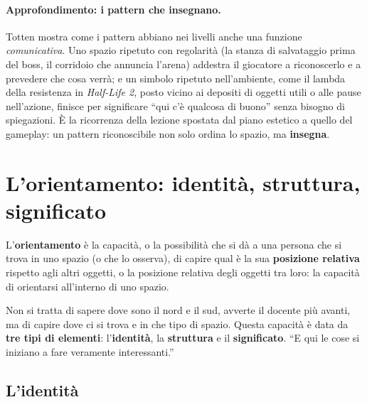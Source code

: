 \paragraph{Approfondimento: i pattern che insegnano.} Totten mostra come i pattern abbiano
nei livelli anche una funzione \emph{comunicativa}. Uno spazio ripetuto con regolarità (la
stanza di salvataggio prima del boss, il corridoio che annuncia l'arena) addestra il
giocatore a riconoscerlo e a prevedere che cosa verrà; e un simbolo ripetuto
nell'ambiente, come il lambda della resistenza in \emph{Half-Life 2}, posto vicino ai
depositi di oggetti utili o alle pause nell'azione, finisce per significare ``qui c'è
qualcosa di buono'' senza bisogno di spiegazioni. È la ricorrenza della lezione spostata
dal piano estetico a quello del gameplay: un pattern riconoscibile non solo ordina lo
spazio, ma \textbf{insegna}.

\section{L'orientamento: identità, struttura, significato}
\label{gd17:sec:orientamento}



\begin{definition}[Orientamento]
L'\textbf{orientamento} è la capacità, o la possibilità che si dà a una persona che si
trova in uno spazio (o che lo osserva), di capire qual è la sua \textbf{posizione
relativa} rispetto agli altri oggetti, o la posizione relativa degli oggetti tra loro: la
capacità di orientarsi all'interno di uno spazio.
\end{definition}

Non si tratta di sapere dove sono il nord e il sud, avverte il docente più avanti, ma di
capire dove ci si trova e in che tipo di spazio. Questa capacità è data da \textbf{tre
tipi di elementi}: l'\textbf{identità}, la \textbf{struttura} e il
\textbf{significato}. ``E qui le cose si iniziano a fare veramente interessanti.''

\subsection{L'identità}

